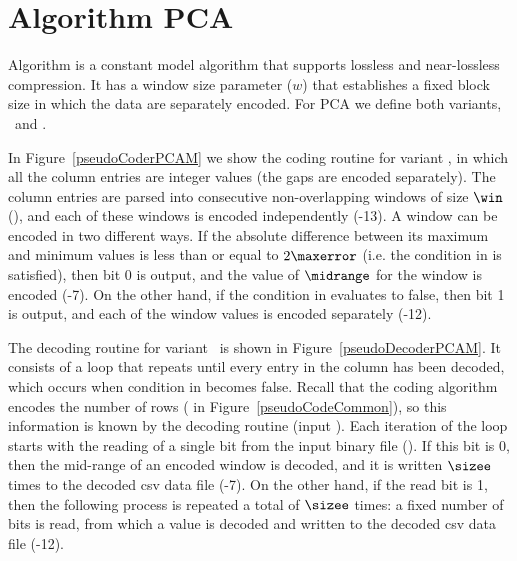 
\vspace{-15pt}
\section{Algorithm PCA}
\label{algo:pca}


\vspace{-5pt}
Algorithm \textit{\PCAfull} \cite{coder:pca} is a constant model algorithm that supports lossless and near-lossless compression. It has a window size parameter ($w$) that establishes a fixed block size in which the data are separately encoded. For PCA we define both variants, \maskalgo\ and \NOmaskalgo.


In Figure~\ref{pseudoCoderPCAM} we show the coding routine for variant \maskalgo, in which all the column entries are integer values (the gaps are encoded separately). The column entries are parsed into consecutive non-overlapping windows of size $\win$ (), and each of these windows is encoded independently (-13). A window can be encoded in two different ways. If the absolute difference between its maximum and minimum values is less than or equal to $2\maxerror$ (i.e. the condition in  is satisfied), then bit 0 is output, and the value of $\midrange$ for the window is encoded (-7). On the other hand, if the condition in  evaluates to false, then bit 1 is output, and each of the window values is encoded separately (-12).  


The decoding routine for variant \maskalgo\ is shown in Figure~\ref{pseudoDecoderPCAM}. It consists of a loop that repeats until every entry in the column has been decoded, which occurs when condition in  becomes false. Recall that the coding algorithm encodes the number of rows ( in Figure~\ref{pseudoCodeCommon}), so this information is known by the decoding routine (input \colSize). Each iteration of the loop starts with the reading of a single bit from the input binary file (). If this bit is 0, then the mid-range of an encoded window is decoded, and it is written $\sizee$ times to the decoded csv data file (-7). On the other hand, if the read bit is 1, then the following process is repeated a total of $\sizee$ times: a fixed number of bits is read, from which a value is decoded and written to the decoded csv data file (-12).


\clearpage





\vspace{+20pt}



